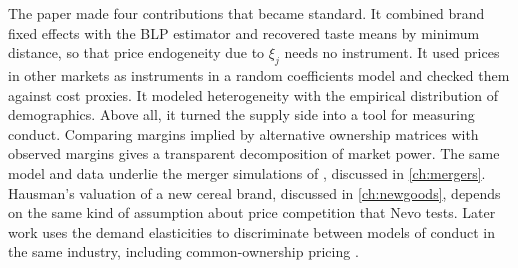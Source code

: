  The paper made four contributions that became standard. It combined brand fixed effects
with the BLP estimator and recovered taste means by minimum distance, so that price endogeneity due to $\xi_j$
needs no instrument. It used prices in other markets as instruments in a random coefficients model and checked
them against cost proxies. It modeled heterogeneity with the empirical distribution of demographics. Above all,
it turned the supply side into a tool for measuring conduct. Comparing margins implied by alternative ownership
matrices with observed margins gives a transparent decomposition of market power. The same model and data
underlie the merger simulations of \citet{Nevo2000b}, discussed in \cref{ch:mergers}. Hausman's valuation of a
new cereal brand, discussed in \cref{ch:newgoods}, depends on the same kind of assumption about price
competition that Nevo tests. Later work uses the demand elasticities to discriminate between models of conduct
in the same industry, including common-ownership pricing \citep{BackusConlonSinkinson2021}.

